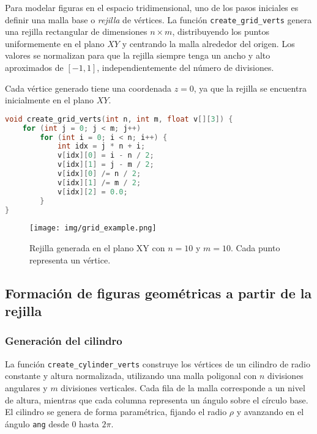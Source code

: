 \documentclass[12pt]{article}
\begin{document}
    Para modelar figuras en el espacio tridimensional, uno de los pasos iniciales es definir una malla base o \textit{rejilla} de vértices. La función \texttt{create\_grid\_verts} genera una rejilla rectangular de dimensiones $n \times m$, distribuyendo los puntos uniformemente en el plano $XY$ y centrando la malla alrededor del origen. Los valores se normalizan para que la rejilla siempre tenga un ancho y alto aproximados de $[-1, 1]$, independientemente del número de divisiones.

    Cada vértice generado tiene una coordenada $z = 0$, ya que la rejilla se encuentra inicialmente en el plano $XY$.

    \begin{lstlisting}[language=C, caption={Generación de vértices para una rejilla centrada}]
void create_grid_verts(int n, int m, float v[][3]) {
    for (int j = 0; j < m; j++)
        for (int i = 0; i < n; i++) {
            int idx = j * n + i;
            v[idx][0] = i - n / 2;
            v[idx][1] = j - m / 2;
            v[idx][0] /= n / 2;
            v[idx][1] /= m / 2;
            v[idx][2] = 0.0;
        }
}
    \end{lstlisting}

    \begin{figure}[H]
        \centering
        \texttt{[image: img/grid\_example.png]}
        \caption{Rejilla generada en el plano XY con $n = 10$ y $m = 10$. Cada punto representa un vértice.}
    \end{figure}


    \subsection{Formación de figuras geométricas a partir de la rejilla}

    \subsubsection{Generación del cilindro}

    La función \texttt{create\_cylinder\_verts} construye los vértices de un cilindro de radio constante y altura normalizada, utilizando una malla poligonal con $n$ divisiones angulares y $m$ divisiones verticales. Cada fila de la malla corresponde a un nivel de altura, mientras que cada columna representa un ángulo sobre el círculo base. El cilindro se genera de forma paramétrica, fijando el radio $\rho$ y avanzando en el ángulo \texttt{ang} desde $0$ hasta $2\pi$.
\end{document}
